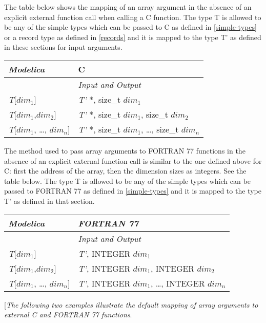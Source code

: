 The table below shows the mapping of an array argument in the absence of
an explicit external function call when calling a C function. The type T
is allowed to be any of the simple types which can be passed to C as
defined in \autoref{simple-types} or a record type as defined in 
\autoref{records} and it is mapped to the type T' as defined in these sections
for input arguments.

\begin{longtable}[]{|l|l|}
\hline
\emph{Modelica} & C\\ \hline
& \emph{Input and Output}\\ \hline
\endhead
\emph{T}{[}$\textit{dim}_1${]} & \emph{T'} *, size\_t
$\textit{dim}_1$\\ \hline
\emph{T}{[}$\textit{dim}_1$,$\textit{dim}_2${]} &
\emph{T'} *, size\_t $\textit{dim}_1$, size\_t
$\textit{dim}_2$\\ \hline
\emph{T}{[}$\textit{dim}_1$, \ldots{},
$\textit{dim}_{n}${]} & \emph{T'} *, size\_t
$\textit{dim}_1$, \ldots{}, size\_t
$\textit{dim}_{n}$\\ \hline
\end{longtable}

The method used to pass array arguments to FORTRAN 77 functions in the
absence of an explicit external function call is similar to the one
defined above for C: first the address of the array, then the dimension
sizes as integers. See the table below. The type T is allowed to be any
of the simple types which can be passed to FORTRAN 77 as defined in
\autoref{simple-types} and it is mapped to the type T' as defined in that
section.

\begin{longtable}[]{|l|l|}
\hline
\emph{Modelica} & \emph{FORTRAN 77}\\ \hline
& \emph{Input and Output}\\ \hline
\endhead
\emph{T}{[}$\textit{dim}_1${]} & \emph{T'}, INTEGER
$\textit{dim}_1$\\ \hline
\emph{T}{[}$\textit{dim}_1$,$\textit{dim}_2${]} &
\emph{T'}, INTEGER $\textit{dim}_1$, INTEGER
$\textit{dim}_2$\\ \hline
\emph{T}{[}$\textit{dim}_1$, \ldots{},
$\textit{dim}_{n}${]} & \emph{T'}, INTEGER
$\textit{dim}_1$, \ldots{}, INTEGER
$\textit{dim}_{n}$\\ \hline

\end{longtable}

{[}\emph{The following two examples illustrate the default mapping of
array arguments to external C and FORTRAN 77 functions}.

